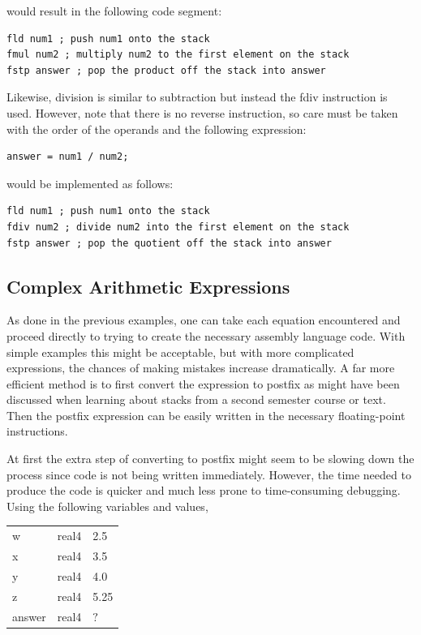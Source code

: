 \documentclass[10pt]{book}
\begin{document}
would result in the following code segment:

\begin{verbatim}
fld num1 ; push num1 onto the stack
fmul num2 ; multiply num2 to the first element on the stack
fstp answer ; pop the product off the stack into answer
\end{verbatim}

Likewise, division is similar to subtraction but instead the fdiv instruction is used. However, note that there is no reverse instruction, so care must be taken with the order of the operands and the following expression:

\begin{verbatim}
answer = num1 / num2;
\end{verbatim}

would be implemented as follows:

\begin{verbatim}
fld num1 ; push num1 onto the stack
fdiv num2 ; divide num2 into the first element on the stack
fstp answer ; pop the quotient off the stack into answer
\end{verbatim}

\subsection{Complex Arithmetic Expressions}
As done in the previous examples, one can take each equation encountered and proceed directly to trying to create the necessary assembly language code. With simple examples this might be acceptable, but with more complicated expressions, the chances of making mistakes increase dramatically. A far more efficient method is to first convert the expression to postfix as might have been discussed when learning about stacks from a second semester course or text. Then the postfix expression can be easily written in the necessary floating-point instructions.

At first the extra step of converting to postfix might seem to be slowing down the process since code is not being written immediately. However, the time needed to produce the code is quicker and much less prone to time-consuming debugging. Using the following variables and values,

\begin{center}
\begin{tabular}{lll}
w & real4 & 2.5 \\
x & real4 & 3.5 \\
y & real4 & 4.0 \\
z & real4 & 5.25 \\
answer & real4 & $?$ \\
\end{tabular}
\end{center}
\end{document}
